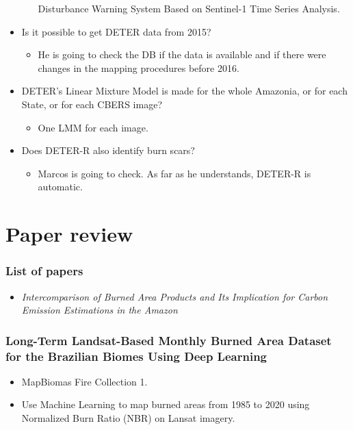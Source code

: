 \documentclass{beamer}
\begin{document}
\begin{frame}[t, allowframebreaks]
\begin{itemize}
\begin{itemize}
                Disturbance Warning System Based on Sentinel-1 Time Series 
                Analysis.
        \end{itemize}
        \item Is it possible to get DETER data from 2015? 
        \begin{itemize}
            \item He is going to check the DB if the data is available and if
                there were changes in the mapping procedures before 2016.
        \end{itemize}
        \item DETER's Linear Mixture Model is made for the whole Amazonia, or
            for each State, or for each CBERS image?
        \begin{itemize}
            \item One LMM for each image.
        \end{itemize}
    \item Does DETER-R also identify burn scars? 
        \begin{itemize}
            \item Marcos is going to check. As far as he understands, DETER-R
                is automatic.
        \end{itemize}
    \end{itemize}
\end{frame}



\section{Paper review}

\begin{frame}
    \frametitle{List of papers}
    \begin{itemize}
        \item \textit{Intercomparison of Burned Area Products and Its 
            Implication for Carbon Emission Estimations in the Amazon}
    \end{itemize}
\end{frame}



\begin{frame}[t, allowframebreaks]
    \frametitle{Long-Term Landsat-Based Monthly Burned Area Dataset for 
            the Brazilian Biomes Using Deep Learning~\cite{alencar2022}}
    \begin{itemize}
        \item MapBiomas Fire Collection 1.
        \item Use Machine Learning to map burned areas from 1985 to 2020 using
            Normalized Burn Ratio (NBR) on Lansat imagery.
    \end{itemize}
\end{frame}
\end{document}
